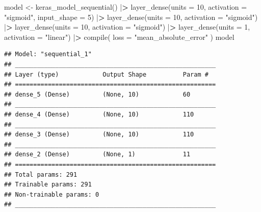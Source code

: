 \documentclass[
]{book}
\newenvironment{Shaded}{\begin{snugshade}}{\end{snugshade}}
\newcommand{\AttributeTok}[1]{\textcolor[rgb]{0.61,0.61,0.61}{#1}}
\newcommand{\DecValTok}[1]{\textcolor[rgb]{0.06,0.06,0.06}{#1}}
\newcommand{\ErrorTok}[1]{\textcolor[rgb]{0.14,0.14,0.14}{\textbf{#1}}}
\newcommand{\FunctionTok}[1]{\textcolor[rgb]{0,0,0}{#1}}
\newcommand{\NormalTok}[1]{#1}
\newcommand{\OtherTok}[1]{\textcolor[rgb]{0.37,0.37,0.37}{#1}}
\newcommand{\SpecialCharTok}[1]{\textcolor[rgb]{0,0,0}{#1}}
\newcommand{\StringTok}[1]{\textcolor[rgb]{0.5,0.5,0.5}{#1}}
\begin{document}
\begin{Shaded}
\begin{Highlighting}[]
\NormalTok{model }\OtherTok{\textless{}{-}} \FunctionTok{keras\_model\_sequential}\NormalTok{() }\SpecialCharTok{|}\ErrorTok{\textgreater{}}
  \FunctionTok{layer\_dense}\NormalTok{(}\AttributeTok{units =} \DecValTok{10}\NormalTok{, }\AttributeTok{activation =} \StringTok{"sigmoid"}\NormalTok{, }
              \AttributeTok{input\_shape =} \DecValTok{5}\NormalTok{) }\SpecialCharTok{|}\ErrorTok{\textgreater{}}
  \FunctionTok{layer\_dense}\NormalTok{(}\AttributeTok{units =} \DecValTok{10}\NormalTok{, }\AttributeTok{activation =} \StringTok{"sigmoid"}\NormalTok{) }\SpecialCharTok{|}\ErrorTok{\textgreater{}}
  \FunctionTok{layer\_dense}\NormalTok{(}\AttributeTok{units =} \DecValTok{10}\NormalTok{, }\AttributeTok{activation =} \StringTok{"sigmoid"}\NormalTok{) }\SpecialCharTok{|}\ErrorTok{\textgreater{}}
  \FunctionTok{layer\_dense}\NormalTok{(}\AttributeTok{units =} \DecValTok{1}\NormalTok{, }\AttributeTok{activation =} \StringTok{"linear"}\NormalTok{) }\SpecialCharTok{|}\ErrorTok{\textgreater{}}
  \FunctionTok{compile}\NormalTok{(}
    \AttributeTok{loss =} \StringTok{"mean\_absolute\_error"}
\NormalTok{  )}
\NormalTok{model}
\end{Highlighting}
\end{Shaded}

\begin{verbatim}
## Model: "sequential_1"
## _______________________________________________________
## Layer (type)            Output Shape          Param #  
## =======================================================
## dense_5 (Dense)         (None, 10)            60       
## _______________________________________________________
## dense_4 (Dense)         (None, 10)            110      
## _______________________________________________________
## dense_3 (Dense)         (None, 10)            110      
## _______________________________________________________
## dense_2 (Dense)         (None, 1)             11       
## =======================================================
## Total params: 291
## Trainable params: 291
## Non-trainable params: 0
## _______________________________________________________
\end{verbatim}
\end{document}
